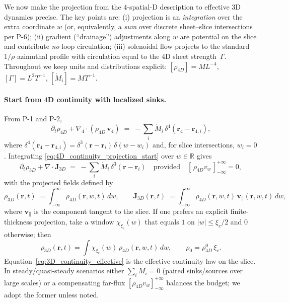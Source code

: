 We now make the projection from the $4$-spatial-D description to effective $3$D dynamics precise. The key points are:
(i) projection is an \emph{integration} over the extra coordinate $w$ (or, equivalently, a \emph{sum} over discrete sheet–slice intersections per P-6);
(ii) gradient (“drainage”) adjustments along $w$ are potential on the slice and contribute \emph{no} loop circulation;
(iii) solenoidal flow projects to the standard $1/\rho$ azimuthal profile with circulation equal to the $4$D sheet strength~$\Gamma$.
Throughout we keep units and distributions explicit: $[\rho_{4D}]=ML^{-4}$, $[\Gamma]=L^2T^{-1}$, $[\dot M_i]=MT^{-1}$.

\paragraph{Start from $4$D continuity with localized sinks.}
From P-1 and P-2,
\begin{equation}
  \partial_t \rho_{4D} + \nabla_4\!\cdot(\rho_{4D}\,\mathbf v_4)
  \;=\; -\sum_i \dot M_i\,\delta^4(\mathbf r_4-\mathbf r_{4,i}),
  \label{eq:4D_continuity_projection_start}
\end{equation}
where $\delta^4(\mathbf r_4-\mathbf r_{4,i})=\delta^3(\mathbf r-\mathbf r_i)\,\delta(w-w_i)$ and, for slice intersections, $w_i=0$.
Integrating \eqref{eq:4D_continuity_projection_start} over $w\in\mathbb R$ gives
\begin{equation}
  \partial_t \rho_{3D} + \nabla\!\cdot \mathbf J_{3D}
  \;=\; -\sum_i \dot M_i\,\delta^3(\mathbf r-\mathbf r_i)
  \quad \text{provided}\quad
  [\,\rho_{4D} v_w\,]_{-\infty}^{+\infty}=0,
  \label{eq:3D_continuity_effective}
\end{equation}
with the projected fields defined by
\begin{equation}
  \rho_{3D}(\mathbf r,t)\;=\!\!\int_{-\infty}^{\infty}\!\! \rho_{4D}(\mathbf r,w,t)\,dw,
  \qquad
  \mathbf J_{3D}(\mathbf r,t)\;=\!\!\int_{-\infty}^{\infty}\!\! \rho_{4D}(\mathbf r,w,t)\,\mathbf v_{\!\parallel}(\mathbf r,w,t)\,dw,
  \label{eq:projection_map_defs}
\end{equation}
where $\mathbf v_{\!\parallel}$ is the component tangent to the slice. If one prefers an explicit finite-thickness projection, take a window $\chi_{\xi_c}(w)$ that equals $1$ on $|w|\le \xi_c/2$ and $0$ otherwise; then
\begin{equation}
  \rho_{3D}(\mathbf r,t)=\int \chi_{\xi_c}(w)\,\rho_{4D}(\mathbf r,w,t)\,dw,
  \qquad
  \rho_0=\rho_{4D}^0\,\xi_c .
  \label{eq:slab_projection}
\end{equation}
Equation~\eqref{eq:3D_continuity_effective} is the effective continuity law on the slice. In steady/quasi-steady scenarios either $\sum_i\dot M_i=0$ (paired sinks/sources over large scales) or a compensating far-flux $[\rho_{4D}v_w]_{-\infty}^{+\infty}$ balances the budget; we adopt the former unless noted.


